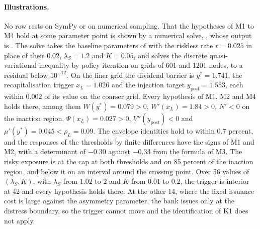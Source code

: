 \paragraph{Illustrations.} No row rests on SymPy or on numerical sampling. That
the hypotheses of M1 to M4 hold at some parameter point is shown by a numerical
solve, , whose output is
. The solve takes the baseline parameters
of \citet{bayraktar2026} with the riskless rate $r=0.025$ in place of their
$0.02$, $\lambda_S=1.2$ and $K=0.05$, and solves the discrete
quasi-variational inequality by policy iteration on grids of 601 and 1201
nodes, to a residual below $10^{-12}$. On the finer grid the dividend barrier is
$y^*=1.741$, the recapitalisation trigger $x_L=1.026$ and the injection target
$y_{\text{post}}=1.553$, each within $0.002$ of its value on the coarser grid.
Every hypothesis of M1, M2 and M4 holds there, among them $W(y^*)=0.079>0$,
$W'(x_L)=1.84>0$, $N'<0$ on the inaction region, $\Psi(x_L)=0.027>0$,
$V''(y_{\text{post}})<0$ and $\mu'(y^*)=0.045<\rho_L=0.09$. The envelope
identities hold to within $0.7$ percent, and the responses of the thresholds
by finite differences have the signs of M1 and M2, with a determinant of
$-0.30$ against $-0.33$ from the formula of M3. The risky exposure is at the cap
at both thresholds and on 85 percent of the inaction region, and below it on an
interval around the crossing point. Over 56 values of $(\lambda_S,K)$, with
$\lambda_S$ from $1.02$ to $2$ and $K$ from $0.01$ to $0.2$, the trigger is
interior at 42 and every hypothesis holds there. At the other 14, where the
fixed issuance cost is large against the asymmetry parameter, the bank issues
only at the distress boundary, so the trigger cannot move and the
identification of K1 does not apply.

